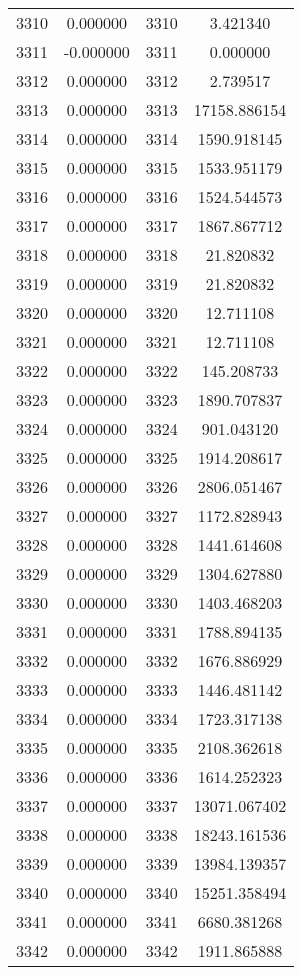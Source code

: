 \documentclass[12pt]{article}
\begin{document}
\begin{longtable}{@{}cccc@{}}
3310 & 0.000000 & 3310 & 3.421340 \\
3311 & -0.000000 & 3311 & 0.000000 \\
3312 & 0.000000 & 3312 & 2.739517 \\
3313 & 0.000000 & 3313 & 17158.886154 \\
3314 & 0.000000 & 3314 & 1590.918145 \\
3315 & 0.000000 & 3315 & 1533.951179 \\
3316 & 0.000000 & 3316 & 1524.544573 \\
3317 & 0.000000 & 3317 & 1867.867712 \\
3318 & 0.000000 & 3318 & 21.820832 \\
3319 & 0.000000 & 3319 & 21.820832 \\
3320 & 0.000000 & 3320 & 12.711108 \\
3321 & 0.000000 & 3321 & 12.711108 \\
3322 & 0.000000 & 3322 & 145.208733 \\
3323 & 0.000000 & 3323 & 1890.707837 \\
3324 & 0.000000 & 3324 & 901.043120 \\
3325 & 0.000000 & 3325 & 1914.208617 \\
3326 & 0.000000 & 3326 & 2806.051467 \\
3327 & 0.000000 & 3327 & 1172.828943 \\
3328 & 0.000000 & 3328 & 1441.614608 \\
3329 & 0.000000 & 3329 & 1304.627880 \\
3330 & 0.000000 & 3330 & 1403.468203 \\
3331 & 0.000000 & 3331 & 1788.894135 \\
3332 & 0.000000 & 3332 & 1676.886929 \\
3333 & 0.000000 & 3333 & 1446.481142 \\
3334 & 0.000000 & 3334 & 1723.317138 \\
3335 & 0.000000 & 3335 & 2108.362618 \\
3336 & 0.000000 & 3336 & 1614.252323 \\
3337 & 0.000000 & 3337 & 13071.067402 \\
3338 & 0.000000 & 3338 & 18243.161536 \\
3339 & 0.000000 & 3339 & 13984.139357 \\
3340 & 0.000000 & 3340 & 15251.358494 \\
3341 & 0.000000 & 3341 & 6680.381268 \\
3342 & 0.000000 & 3342 & 1911.865888 \\

\end{longtable}
\end{document}
